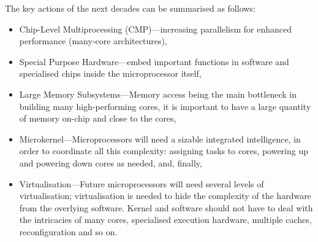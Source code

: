 The key actions of the next decades can be summarised as follows:
\begin{itemize}
\item Chip-Level Multiprocessing (CMP)---increasing parallelism for enhanced 
performance (many-core architectures),
\item Special Purpose Hardware---embed important functions in
software and specialised chips inside the microprocessor itself,
\item Large Memory Subsystems---Memory access being the main bottleneck in
building many high-performing cores, it is important to have a large quantity of 
memory on-chip and close to the cores,
\item Microkernel---Microprocessors will need a sizable integrated 
intelligence, in order to coordinate all this complexity: assigning tasks to 
cores, powering up and powering down cores as needed, and, finally,
\item Virtualisation---Future microprocessors will need several levels of
virtualisation; virtualisation is needed to hide the complexity of the hardware
from the overlying software. Kernel and software should not have to deal with 
the intricacies of many cores, specialised execution hardware, multiple caches, 
reconfiguration and so on.
\end{itemize}

